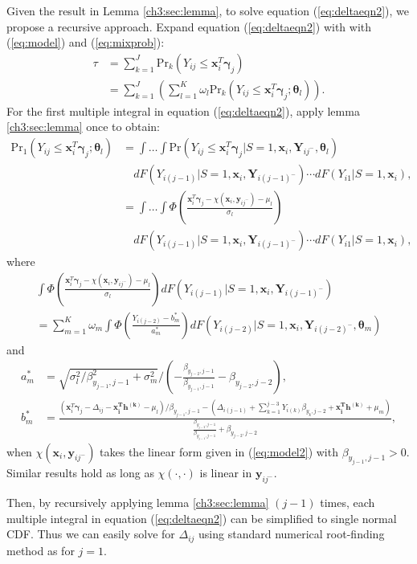\documentclass[12pt]{article}
\newcommand{\prob}{\mbox{Pr}}
\begin{document}
\begin{itemize}
  Given the result in Lemma \ref{ch3:sec:lemma}, to solve equation
  (\ref{eq:deltaeqn2}), we propose a recursive approach.
Expand equation (\ref{eq:deltaeqn2}) with with (\ref{eq:model}) and (\ref{eq:mixprob}):
\begin{align*}
\tau & = \sum_{k = 1}^J\prob_k (Y_{ij} \leq \bm x_{i}^T \bm \gamma_j) \\
& = \sum_{k = 1}^J \left( \sum_{l = 1}^K \omega_{l} \prob_k (Y_{ij} \leq \bm x_{i}^T \bm \gamma_j; \bm \theta_l) \right).
\end{align*}
For the first
  multiple integral in equation (\ref{eq:deltaeqn2}), apply lemma
  \ref{ch3:sec:lemma} once to obtain:
  \begin{align*}
    \prob_1 (Y_{ij} \leq \bm x_{i}^T \bm \gamma_j; \bm \theta_l) & =
    \int\dots\int
    \prob (Y_{ij} \leq \bm x_{i}^T\bm \gamma_j | S=1, \bm x_{i}, \bm Y_{ij^{-}}, \bm \theta_l)\\
    & \quad  dF(Y_{i(j-1)}|S=1, \bm x_{i}, \bm Y_{i(j-1)^{-}}) \cdots d F (Y_{i1} | S = 1, \bm x_{i}), \\
    & = \int\dots\int \Phi \left( \frac{\bm x_{i}^T \bm \gamma_j - \chi(\bm x_{i}, \bm y_{ij^{-}}) - \mu_l}{\sigma_{l}} \right) \\
    & \quad   dF(Y_{i(j-1)}|S=1, \bm x_{i}, \bm Y_{i(j-1)^{-}}) \cdots d F (Y_{i1} | S = 1, \bm x_{i}),
\end{align*}
where
\begin{multline*}
\int \Phi \left( \frac{\bm x_{i}^T \bm \gamma_j - \chi(\bm x_{i}, \bm y_{ij^{-}}) - \mu_l}{\sigma_{l}}\right) dF(Y_{i(j-1)}|S=1, \bm x_{i}, \bm Y_{i(j-1)^{-}})  \\
 =  \sum_{m = 1}^K \omega_m\int \Phi \left( \frac{Y_{i(j-2)} - b_m^{*}}{a_m^{*}} \right) dF(Y_{i(j-2)}|S=1, \bm x_{i}, \bm Y_{i(j-2)^{-}}, \bm \theta_m)
\end{multline*}
and
\begin{align*}
a_m^{*} & = \sqrt{\sigma_l^2/\beta_{y_{j-1}, j-1}^2 + \sigma_{m}^2} \big / \left( - \frac{\beta_{y_{j-2}, j-1}}{\beta_{y_{j-1}, j-1}} - \beta_{y_{j-2}, j-2} \right), \\
b_m^{*} & = \frac{ (\bm x_i^T \bm \gamma_j - \Delta_{ij} - \bm{x_i^T h^{(k)}} - \mu_l)/\beta_{y_{j-1}, j-1} - (\Delta_{i(j-1)} + \sum_{k=1}^{j-3} Y_{i(k)} \beta_{y_k, j-2} + \bm{x_{i}^{T}h^{(k)}} + \mu_m)}{\frac{\beta_{y_{j-2}, j-1}}{\beta_{y_{j-1}, j-1}} + \beta_{y_{j-2}, j-2}},
\end{align*}
when $\chi(\bm x_i, \bm y_{ij^{-}})$ takes the linear form given in (\ref{eq:model2}) with  $\beta_{y_{j-1}, j-1} > 0$.  Similar results hold as long as $\chi(\cdot,\cdot)$ is linear in $\bm y_{ij^{-}}$.

  Then, by recursively applying lemma \ref{ch3:sec:lemma} $(j-1)$ times,
  each multiple integral in equation (\ref{eq:deltaeqn2}) can be
  simplified to single normal CDF. Thus we can easily solve for
  $\Delta_{ij}$ using standard numerical root-finding method as for $j
  = 1$.

\end{itemize}
\end{document}
